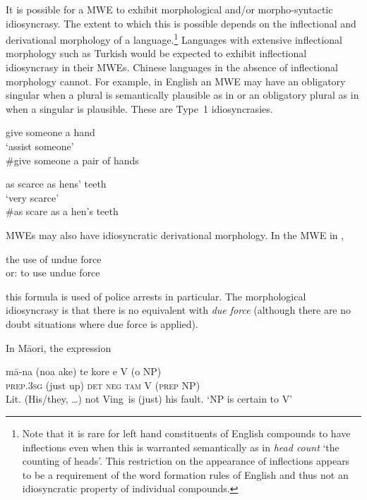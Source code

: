 \documentclass[output=paper]{langsci/langscibook}
\begin{document}
It is possible for a MWE to exhibit morphological and/or morpho-syntactic idiosyncrasy. The extent to which this is possible depends on the inflectional and derivational morphology of a language.\footnote{   Note that it is rare for left hand constituents of  English compounds to have inflections even when this is warranted semantically as in \textit{head count} ‘the counting of heads’. This restriction on the appearance of inflections appears to be a requirement of the word formation rules of English and thus not an idiosyncratic property of individual compounds.}  Languages with extensive inflectional morphology such as Turkish  would be expected to exhibit inflectional idiosyncrasy in their MWEs. Chinese languages in the absence of inflectional morphology cannot. For example, in English an MWE may have an obligatory singular when a plural is semantically plausible as in  or an obligatory plural as in  when a singular is plausible. These are Type~1 idiosyncrasies.

\begin{exe}
\ex\label{ex:ex13}   give someone a hand\\
‘assist someone’\\
\#give someone a pair of hands

\ex\label{ex:ex14}  as scarce as hens’ teeth\\
  ‘very scarce’\\
  \#as scare as a hen’s teeth
\end{exe}

MWEs may also have idiosyncratic derivational morphology. In the MWE in ,

\begin{exe}
\ex\label{ex:ex15}   the use of undue force\\ 
or: to use undue force
\end{exe}

\noindent
this formula is used of police arrests in particular. The morphological idiosyncrasy is that there is no equivalent with \textit{due force} (although there are no doubt situations where due force is applied). 

In M\=aori, the expression 


\ea\label{ex:ex16}
\gll m\=a-na    (noa ake) te     kore e        V (o NP)\\
     \textsc{prep}.\textsc{3sg} (just up)  \textsc{det} \textsc{neg} \textsc{tam} V (\textsc{prep} NP)\\
\glt Lit. (His/they, \ldots) not Ving~is (just) his fault.
\glt ‘NP is certain to V’
\z
\end{document}
